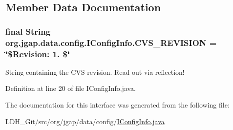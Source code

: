 \subsection{Member Data Documentation}
\hypertarget{interfaceorg_1_1jgap_1_1data_1_1config_1_1_i_config_info_ad43643ae9c6d1601963113583db6af25}{
\subsubsection[{C\-V\-S\-\_\-\-R\-E\-V\-I\-S\-I\-O\-N}]{\setlength{\rightskip}{0pt plus 5cm}final String org.\-jgap.\-data.\-config.\-I\-Config\-Info.\-C\-V\-S\-\_\-\-R\-E\-V\-I\-S\-I\-O\-N = \char`\"{}\$Revision\-: 1. \$\char`\"{}\hspace{0.3cm}{\ttfamily [static]}}}\label{interfaceorg_1_1jgap_1_1data_1_1config_1_1_i_config_info_ad43643ae9c6d1601963113583db6af25}
String containing the C\-V\-S revision. Read out via reflection! 

Definition at line 20 of file I\-Config\-Info.\-java.



The documentation for this interface was generated from the following file\-:\begin{DoxyCompactItemize}
\item 
L\-D\-H\-\_\-\-Git/src/org/jgap/data/config/\hyperlink{_i_config_info_8java}{I\-Config\-Info.\-java}\end{DoxyCompactItemize}
